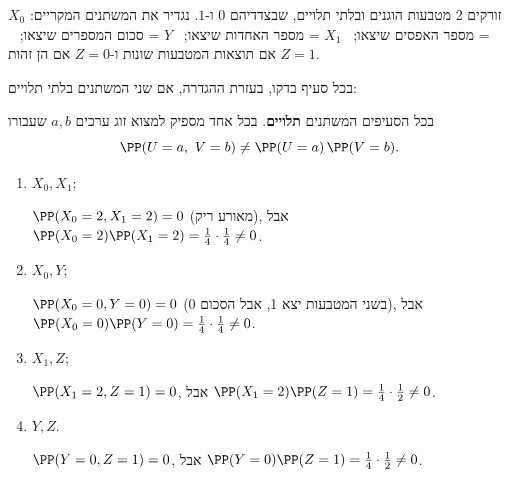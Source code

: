 זורקים 2 מטבעות הוגנים ובלתי תלויים, שבצדדיהם $0$ ו-$1$. נגדיר את המשתנים המקריים:
$X_0$ = מספר האפסים שיצאו; \ $X_1$ = מספר האחדות שיצאו; \ $Y$ = סכום המספרים שיצאו; \ $Z=1$ אם תוצאות המטבעות שונות ו-$Z=0$ אם הן זהות.

בכל סעיף בדקו, בעזרת ההגדרה, אם שני המשתנים בלתי תלויים:
\begin{solbox}
\unverified
בכל הסעיפים המשתנים \textbf{תלויים}. בכל אחד מספיק למצוא זוג ערכים $a,b$ שעבורו
\[
\PP(U=a,\ V=b)\neq\PP(U=a)\,\PP(V=b).
\]
\end{solbox}
\begin{enumerate}
\item $X_0,X_1$;
\begin{solbox}
\unverified
$\PP(X_0=2,X_1=2)=0$ (מאורע ריק), אבל $\PP(X_0=2)\PP(X_1=2)=\frac14\cdot\frac14\neq0$.
\end{solbox}
\item $X_0,Y$;
\begin{solbox}
\unverified
$\PP(X_0=0,Y=0)=0$ (בשני המטבעות יצא 1, אבל הסכום 0), אבל $\PP(X_0=0)\PP(Y=0)=\frac14\cdot\frac14\neq0$.
\end{solbox}
\item $X_1,Z$;
\begin{solbox}
\unverified
$\PP(X_1=2,Z=1)=0$, אבל $\PP(X_1=2)\PP(Z=1)=\frac14\cdot\frac12\neq0$.
\end{solbox}
\item $Y,Z$.
\begin{solbox}
\unverified
$\PP(Y=0,Z=1)=0$, אבל $\PP(Y=0)\PP(Z=1)=\frac14\cdot\frac12\neq0$.
\end{solbox}
\end{enumerate}
